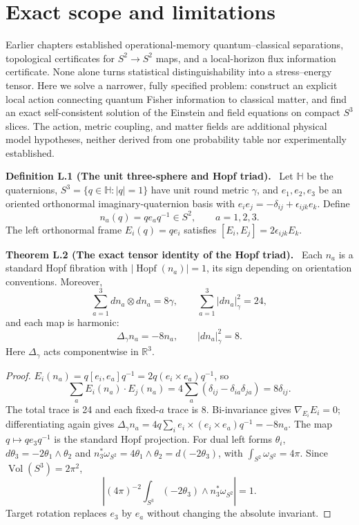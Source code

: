 \documentclass[11pt,a4paper,oneside]{book}
\newcommand{\R}{\mathbb R}\newcommand{\C}{\mathbb C}\newcommand{\Z}{\mathbb Z}\newcommand{\N}{\mathbb N}\newcommand{\Q}{\mathbb Q}
\newcommand{\statement}[3]{\par\medskip\noindent\textbf{#1 #2 (#3).}\ }
\begin{document}
\section{Exact scope and limitations}
Earlier chapters established operational-memory quantum--classical separations, topological certificates for $S^2\to S^2$ maps, and a local-horizon flux information certificate. None alone turns statistical distinguishability into a stress--energy tensor. Here we solve a narrower, fully specified problem: construct an explicit local action connecting quantum Fisher information to classical matter, and find an exact self-consistent solution of the Einstein and field equations on compact $S^3$ slices. The action, metric coupling, and matter fields are additional physical model hypotheses, neither derived from one probability table nor experimentally established.
\statement{Definition}{L.1}{The unit three-sphere and Hopf triad}
Let $\mathbb H$ be the quaternions, $S^3=\{q\in\mathbb H:|q|=1\}$ have unit round metric $\gamma$, and $e_1,e_2,e_3$ be an oriented orthonormal imaginary-quaternion basis with $e_ie_j=-\delta_{ij}+\epsilon_{ijk}e_k$. Define
\begin{equation}n_a(q)=qe_aq^{-1}\in S^2,\qquad a=1,2,3.\tag{229}\end{equation}
The left orthonormal frame $E_i(q)=qe_i$ satisfies $[E_i,E_j]=2\epsilon_{ijk}E_k$.
\statement{Theorem}{L.2}{The exact tensor identity of the Hopf triad}
Each $n_a$ is a standard Hopf fibration with $|\operatorname{Hopf}(n_a)|=1$, its sign depending on orientation conventions. Moreover,
\begin{equation}\sum_{a=1}^3dn_a\otimes dn_a=8\gamma,\qquad\sum_{a=1}^3|dn_a|_\gamma^2=24,\tag{230}\end{equation}
and each map is harmonic:
\begin{equation}\Delta_\gamma n_a=-8n_a,\qquad|dn_a|_\gamma^2=8.\tag{231}\end{equation}
Here $\Delta_\gamma$ acts componentwise in $\R^3$.
\begin{proof}
$E_i(n_a)=q[e_i,e_a]q^{-1}=2q(e_i\times e_a)q^{-1}$, so
\[\sum_aE_i(n_a)\cdot E_j(n_a)=4\sum_a(\delta_{ij}-\delta_{ia}\delta_{ja})=8\delta_{ij}.\]
The total trace is 24 and each fixed-$a$ trace is 8. Bi-invariance gives $\nabla_{E_i}E_i=0$; differentiating again gives $\Delta_\gamma n_a=4q\sum_ie_i\times(e_i\times e_a)q^{-1}=-8n_a$. The map $q\mapsto qe_3q^{-1}$ is the standard Hopf projection. For dual left forms $\theta_i$, $d\theta_3=-2\theta_1\wedge\theta_2$ and $n_3^*\omega_{S^2}=4\theta_1\wedge\theta_2=d(-2\theta_3)$, with $\int_{S^2}\omega_{S^2}=4\pi$. Since $\operatorname{Vol}(S^3)=2\pi^2$,
\[\left|(4\pi)^{-2}\int_{S^3}(-2\theta_3)\wedge n_3^*\omega_{S^2}\right|=1.\]
Target rotation replaces $e_3$ by $e_a$ without changing the absolute invariant.
\end{proof}
\end{document}
